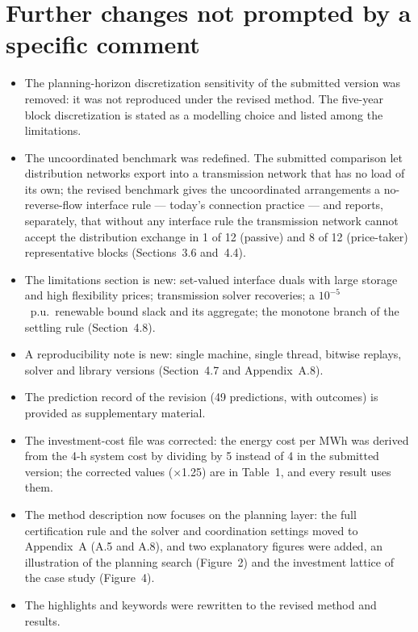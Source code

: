 \documentclass[11pt]{article}
\begin{document}
\section*{Further changes not prompted by a specific comment}

\begin{itemize}[leftmargin=*]
  \item The planning-horizon discretization sensitivity of the submitted version was removed: it was not reproduced under the revised method. The five-year block discretization is stated as a modelling choice and listed among the limitations.
  \item The uncoordinated benchmark was redefined. The submitted comparison let distribution networks export into a transmission network that has no load of its own; the revised benchmark gives the uncoordinated arrangements a no-reverse-flow interface rule --- today's connection practice --- and reports, separately, that without any interface rule the transmission network cannot accept the distribution exchange in 1 of 12 (passive) and 8 of 12 (price-taker) representative blocks (Sections~3.6 and~4.4).
  \item The limitations section is new: set-valued interface duals with large storage and high flexibility prices; transmission solver recoveries; a $10^{-5}$~p.u.\ renewable bound slack and its aggregate; the monotone branch of the settling rule (Section~4.8).
  \item A reproducibility note is new: single machine, single thread, bitwise replays, solver and library versions (Section~4.7 and Appendix~A.8).
  \item The prediction record of the revision (49 predictions, with outcomes) is provided as supplementary material.
  \item The investment-cost file was corrected: the energy cost per MWh was derived from the 4-h system cost by dividing by 5 instead of 4 in the submitted version; the corrected values (×1.25) are in Table~1, and every result uses them.
  \item The method description now focuses on the planning layer: the full certification rule and the solver and coordination settings moved to Appendix~A (A.5 and A.8), and two explanatory figures were added, an illustration of the planning search (Figure~2) and the investment lattice of the case study (Figure~4).
  \item The highlights and keywords were rewritten to the revised method and results.
\end{itemize}
\end{document}
